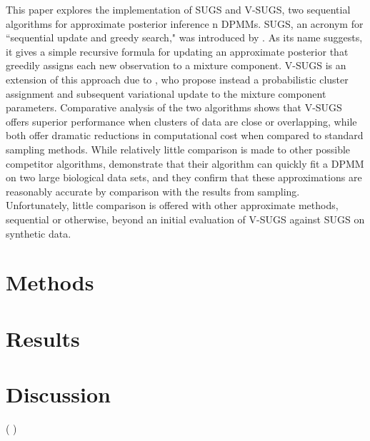 \documentclass{uwstat572}
\newcommand{\vmcomment}[1]{({\color{blue}{VM's comment:}} \textbf{\color{blue}{#1}})}
\begin{document}
This paper explores the implementation of SUGS and V-SUGS, two sequential algorithms for approximate posterior inference n DPMMs. SUGS, an acronym for ``sequential update and greedy search," was introduced by \citet{wang}. As its name suggests, it gives a simple recursive formula for updating an approximate posterior that greedily assigns each new observation to a mixture component. V-SUGS is an extension of this approach due to \citet{zhang}, who propose instead a probabilistic cluster assignment and subsequent variational update to the mixture component parameters. Comparative analysis of the two algorithms shows that V-SUGS offers superior performance when clusters of data are close or overlapping, while both offer dramatic reductions in computational cost when compared to standard sampling methods. While relatively little comparison is made to other possible competitor algorithms, \citet{zhang} demonstrate that their algorithm can quickly fit a DPMM on two large biological data sets, and they confirm that these approximations are reasonably accurate by comparison with the results from sampling. Unfortunately, little comparison is offered with other approximate methods, sequential or otherwise, beyond an initial evaluation of V-SUGS against SUGS on synthetic data.

\section{Methods}

\section{Results}

\section{Discussion}

\vmcomment{Capitalization in references is not protected}

\end{document}

